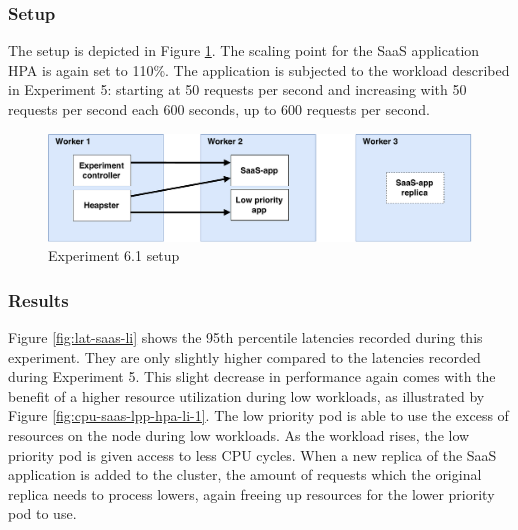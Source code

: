 \subsubsection{Setup}
The setup is depicted in Figure \ref{fig:experiment6}. The scaling point for the SaaS application HPA is again set to 110\%. The application is subjected to the workload described in Experiment 5: starting at 50 requests per second and increasing with 50 requests per second each 600 seconds, up to 600 requests per second.

\begin{figure}
\centering
\includegraphics[width=\columnwidth]{Images/Experiments/Experiment_4_SaaS.pdf}
\caption{Experiment 6.1 setup}
\label{fig:experiment6}
\end{figure}

\subsubsection{Results}
Figure \ref{fig:lat-saas-li} shows the 95th percentile latencies recorded during this experiment. They are only slightly higher compared to the latencies recorded during Experiment 5. This slight decrease in performance again comes with the benefit of a higher resource utilization during low workloads, as illustrated by Figure \ref{fig:cpu-saas-lpp-hpa-li-1}. The low priority pod is able to use the excess of resources on the node during low workloads. As the workload rises, the low priority pod is given access to less CPU cycles. When a new replica of the SaaS application is added to the cluster, the amount of requests which the original replica needs to process lowers, again freeing up resources for the lower priority pod to use. 

